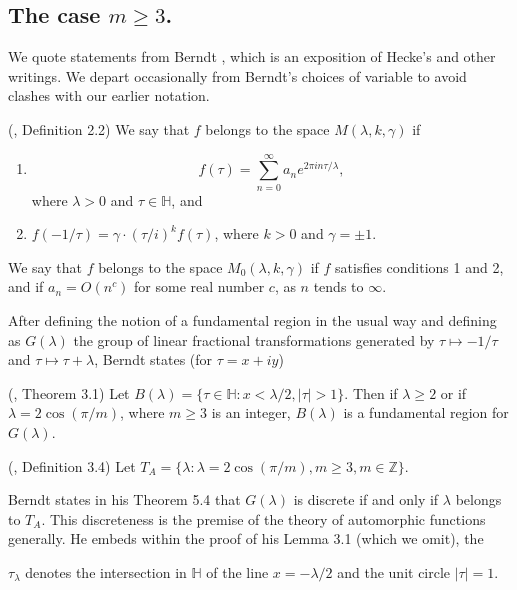 \documentclass{article}
\begin{document}
\subsection[]{The case $m \geq 3$.}
We quote statements from Berndt  
\cite{berndt2008hecke}, which is
an exposition of Hecke's 
\cite{hecke1938lectures} and
other writings. 
We depart occasionally from Berndt's
choices of variable to avoid 
clashes with our earlier
notation.
\begin{definition}
(\cite{berndt2008hecke}, Definition 2.2)
We say that $f$ belongs to the space
$M(\lambda, k, \gamma)$ if
\begin{enumerate}
    \item 
    $$ f(\tau) = \sum_{n = 0}^{\infty}
    a_n e^{2 \pi i n \tau/\lambda},
    $$
    where $\lambda > 0$ and 
    $\tau \in \mathbb{H}$, and
    \item  $f(-1/\tau) = \gamma \cdot (\tau/i)^k f(\tau)$,
    where $k > 0$ and $\gamma = \pm 1$.
\end{enumerate}
We say that $f$ belongs to the space
$M_0(\lambda,k, \gamma)$ if $f$ satisfies conditions
1 and 2, and if $a_n = O(n^c)$
for some real number $c$, as $n$ tends to $\infty$.
\end{definition}
\noindent
After defining the notion of a fundamental 
region in the usual
way and defining as $G(\lambda)$ the group 
of linear fractional transformations
generated by
$\tau \mapsto -1/\tau$ and
$\tau \mapsto \tau + \lambda$,
Berndt states (for $\tau = x + iy$)
\begin{theorem}
(\cite{berndt2008hecke}, Theorem 3.1)
Let $B(\lambda)= \{\tau \in \mathbb{H}:
x < \lambda/2,  |\tau| > 1\}$. Then if 
$\lambda \geq 2$ or if $\lambda = 2 \cos(\pi/m)$,
where $m \geq 3$ is an integer, $B(\lambda)$ is
a fundamental region for $G(\lambda)$.
\end{theorem}
\begin{definition}
(\cite{berndt2008hecke}, Definition 3.4)
Let $T_A = \{ \lambda: 
\lambda = 2 \cos(\pi/m), m \geq 3, m \in \mathbb{Z}\}$.
\end{definition}
\noindent
Berndt states in his Theorem 5.4 that 
$G(\lambda)$ is discrete if and only if
$\lambda$ belongs to $T_A$. This discreteness
is the premise of the theory of 
automorphic functions generally.
He embeds within the
proof of his Lemma 3.1 
(which we omit), the 
\begin{definition}
$\tau_{\lambda}$ denotes the intersection
in $\mathbb{H}$ of the line
$x = -\lambda/2$ and the unit circle
$|\tau| = 1$. 
\end{definition} \noindent
\end{document}
